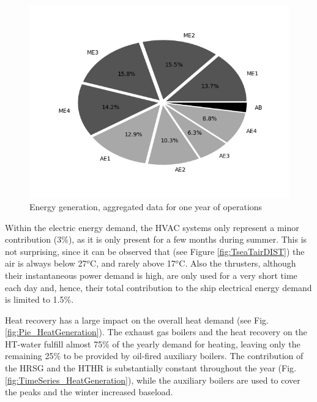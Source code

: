 \documentclass[preprint,12pt]{elsarticle}
\begin{document}
\begin{figure}
	\centering
	\includegraphics[width=0.9\linewidth]{Figures/Pie_EnergyGeneration}
	\caption{Energy generation, aggregated data for one year of operations}
	\label{fig:Pie_EnergyGeneration}
\end{figure}


Within the electric energy demand, the HVAC systems only represent a minor contribution (3\%), as it is only present for a few months during summer. This is not surprising, since it can be observed that (see Figure \ref{fig:TseaTairDIST}) the air is always below 27$^o$C, and rarely above 17$^o$C. Also the thrusters, although their instantaneous power demand is high, are only used for a very short time each day and, hence, their total contribution to the ship electrical energy demand is limited to 1.5\%. 

Heat recovery has a large impact on the overall heat demand (see Fig.  \ref{fig:Pie_HeatGeneration}). The exhaust gas boilers and the heat recovery on the HT-water fulfill almost 75\% of the yearly demand for heating, leaving only the remaining 25\% to be provided by oil-fired auxiliary boilers. The contribution of the HRSG and the HTHR is substantially constant throughout the year (Fig. \ref{fig:TimeSeries_HeatGeneration}), while the auxiliary boilers are used to cover the peaks and the winter increased baseload. 
\end{document}
